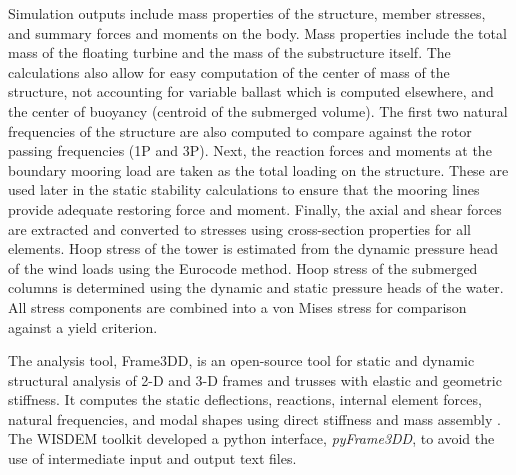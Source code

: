 Simulation outputs include mass properties of the structure, member
stresses, and summary forces and moments on the body.  Mass properties
include the total mass of the floating turbine and the mass of the
substructure itself.  The calculations also allow for easy computation
of the center of mass of the structure, not accounting for variable
ballast which is computed elsewhere, and the center of buoyancy
(centroid of the submerged volume).  The first two natural frequencies
of the structure are also computed to compare against the rotor passing
frequencies (1P and 3P).  Next, the reaction forces and moments at the
boundary mooring load are taken as the total loading on the structure.
These are used later in the static stability calculations to ensure that
the mooring lines provide adequate restoring force and moment.  Finally,
the axial and shear forces  are extracted and converted
to stresses using cross-section properties for all elements.  Hoop
stress of the tower is estimated from the dynamic pressure head of the
wind loads using the Eurocode method.  Hoop stress of the submerged
columns is determined using the dynamic and static pressure heads of the
water.  All stress components are combined into a von Mises stress for
comparison against a yield criterion.

The analysis tool, Frame3DD, is an open-source tool for static and
dynamic structural analysis of 2-D and 3-D frames and trusses with
elastic and geometric stiffness. It computes the static deflections,
reactions, internal element forces, natural frequencies, and modal
shapes using direct stiffness and mass assembly \citep{frame3dd}.  The
WISDEM toolkit developed a python interface, \textit{pyFrame3DD}, to avoid the
use of intermediate input and output text files.

